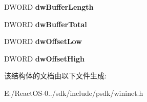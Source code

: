 \begin{DoxyCompactItemize}
D\+W\+O\+RD {\bfseries dw\+Buffer\+Length}
\item 
\mbox{\label{struct___i_n_t_e_r_n_e_t___b_u_f_f_e_r_s_w_aa6cd4cbe35f040881e6baa8704fe7ead}} 
D\+W\+O\+RD {\bfseries dw\+Buffer\+Total}
\item 
\mbox{\label{struct___i_n_t_e_r_n_e_t___b_u_f_f_e_r_s_w_a191b16ac764ed3f1ebde805a0434e6c7}} 
D\+W\+O\+RD {\bfseries dw\+Offset\+Low}
\item 
\mbox{\label{struct___i_n_t_e_r_n_e_t___b_u_f_f_e_r_s_w_a430f9ce75c24c1000ad126628ac2d31e}} 
D\+W\+O\+RD {\bfseries dw\+Offset\+High}
\end{DoxyCompactItemize}


该结构体的文档由以下文件生成\+:\begin{DoxyCompactItemize}
\item 
E\+:/\+React\+O\+S-\/0../sdk/include/psdk/wininet.\+h\end{DoxyCompactItemize}
